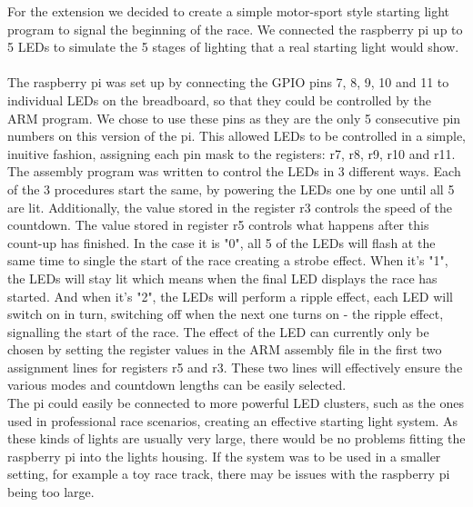 For the extension we decided to create a simple motor-sport style starting light program to signal the beginning of the race. We connected the raspberry pi up to 5 LEDs to simulate the 5 stages of lighting that a real starting light would show. 
~\\

The raspberry pi was set up by connecting the GPIO pins 7, 8, 9, 10 and 11 to individual LEDs on the breadboard, so that they could be controlled by the ARM program. We chose to use these pins as they are the only 5 consecutive pin numbers on this version of the pi. This allowed LEDs to be controlled in a simple, inuitive fashion, assigning each pin mask to the registers: r7, r8, r9, r10 and r11. 
~\\

The assembly program was written to control the LEDs in 3 different ways. Each of the 3 procedures start the same, by powering the LEDs one by one until all 5 are lit. Additionally, the value stored in the register r3 controls the speed of the countdown. The value stored in register r5 controls what happens after this count-up has finished. In the case it is "0", all 5 of the LEDs will flash at the same time to single the start of the race creating a strobe effect. When it's "1", the LEDs will stay lit which means when the final LED displays the race has started. And when it's "2", the LEDs will perform a ripple effect, each LED will switch on in turn, switching off when the next one turns on - the ripple effect, signalling the start of the race. The effect of the LED can currently only be chosen by setting the register values in the ARM assembly file in the first two assignment lines for registers r5 and r3. These two lines will effectively ensure the various modes and countdown lengths can be easily selected. 
~\\

The pi could easily be connected to more powerful LED clusters, such as the ones used in professional race scenarios, creating an effective starting light system. As these kinds of lights are usually very large, there would be no problems fitting the raspberry pi into the lights housing. If the system was to be used in a smaller setting, for example a toy race track, there may be issues with the raspberry pi being too large.
~\\

